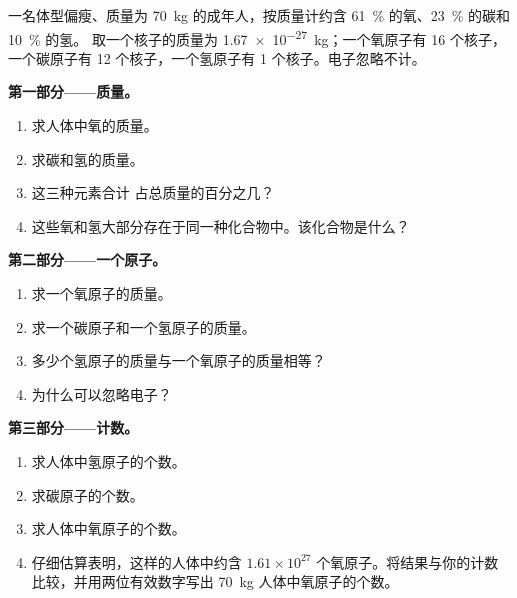 \begin{problem}
\label{pb:g9:elements-universe-earth:1}
一名体型偏瘦、质量为 \qty{70}{kg} 的成年人，按质量计约含
\qty{61}{\percent} 的氧、\qty{23}{\percent} 的碳和 \qty{10}{\percent} 的氢。
取一个核子的质量为 \qty{1.67e-27}{kg}；一个氧原子有 16 个核子，
一个碳原子有 12 个核子，一个氢原子有 1 个核子。电子忽略不计。

\medskip
\noindent\textbf{第一部分——质量。}
\begin{enumerate}
  \item 求人体中氧的质量。
  \item 求碳和氢的质量。
  \item 这三种元素合计
        占总质量的百分之几？
  \item 这些氧和氢大部分存在于同一种化合物中。该化合物是什么？
\end{enumerate}

\medskip
\noindent\textbf{第二部分——一个原子。}
\begin{enumerate}[resume]
  \item 求一个氧原子的质量。
  \item 求一个碳原子和一个氢原子的质量。
  \item 多少个氢原子的质量与一个氧原子的质量相等？
  \item 为什么可以忽略电子？
\end{enumerate}

\medskip
\noindent\textbf{第三部分——计数。}
\begin{enumerate}[resume]
  \item 求人体中氢原子的个数。
  \item 求碳原子的个数。
  \item 求人体中氧原子的个数。
  \item 仔细估算表明，这样的人体中约含 $1.61 \times 10^{27}$
        个氧原子。将结果与你的计数比较，并用两位有效数字写出
        \qty{70}{kg} 人体中氧原子的个数。
\end{enumerate}
\end{problem}
